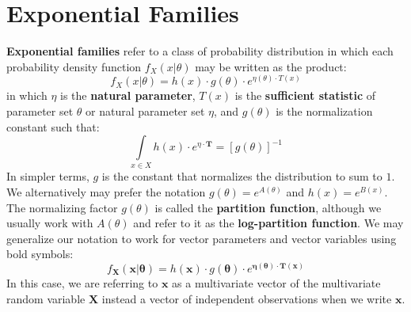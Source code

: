 \documentclass[10pt, a5paper, twoside, openright]{memoir}
\begin{document}
\section{Exponential Families}
\textbf{Exponential families} refer to a class of probability distribution in which each probability density function $f_X(x|\theta)$ may be written as the product:
$$f_X(x|\theta) = h(x) \cdot g(\theta) \cdot e^{\eta (\theta) \cdot T (x)}$$
in which $\eta$ is the \textbf{natural parameter}, $T (x)$ is the \textbf{sufficient statistic} of parameter set $\theta$ or natural parameter set $\eta$, and $g(\theta)$ is the normalization constant such that:
$$\int\limits_{x \in X} h(x) \cdot e^{\eta \cdot \boldsymbol T} = [g(\theta)] ^{-1}$$
In simpler terms, $g$ is the constant that normalizes the distribution to sum to $1$. We alternatively may prefer the notation $g(\theta) = e^{A(\theta)}$ and $h(x) = e^{B(x)}$. The normalizing factor $g(\theta)$ is called the \textbf{partition function}, although we usually work with $A(\theta)$ and refer to it as the \textbf{log-partition function}. We may generalize our notation to work for vector parameters and vector variables using bold symbols:
$$f_{\boldsymbol X}(\boldsymbol x|\boldsymbol \theta) = h(\boldsymbol x) \cdot g(\boldsymbol \theta) \cdot e^{\boldsymbol{\eta (\theta)} \cdot \boldsymbol{T (x)}}$$
In this case, we are referring to $\boldsymbol x$ as a multivariate vector of the multivariate random variable $\boldsymbol X$ instead a vector of independent observations when we write $\boldsymbol x$.

\end{document}

